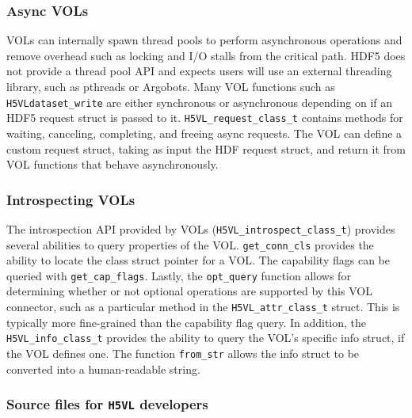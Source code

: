 \subsubsection{Async VOLs}

VOLs can internally spawn thread pools to perform asynchronous operations and remove overhead such as locking and I/O stalls from the critical path. HDF5 does not provide a thread pool API and expects users will use an external threading library, such as pthreads or Argobots. Many VOL functions such as \texttt{H5VLdataset\_write} are either synchronous or asynchronous depending on if an HDF5 request struct is passed to it. \texttt{H5VL\_request\_class\_t} contains methods for waiting, canceling, completing, and freeing async requests. The VOL can define a custom request struct, taking as input the HDF request struct, and return it from VOL functions that behave asynchronously.

\subsubsection{Introspecting VOLs}

The introspection API provided by VOLs (\texttt{H5VL\_introspect\_class\_t}) provides several abilities to query properties of the VOL. \texttt{get\_conn\_cls} provides the ability to locate the class struct pointer for a VOL. The capability flags can be queried with \texttt{get\_cap\_flags}. Lastly, the \texttt{opt\_query} function allows for determining whether or not optional operations are supported by this VOL connector, such as a particular method in the \texttt{H5VL\_attr\_class\_t} struct. This is typically more fine-grained than the capability flag query. In addition, the \texttt{H5VL\_info\_class\_t} provides the ability to query the VOL's specific info struct, if the VOL defines one. The function \texttt{from\_str} allows the info struct to be converted into a human-readable string.

\subsubsection{Source files for \texttt{H5VL} developers}

